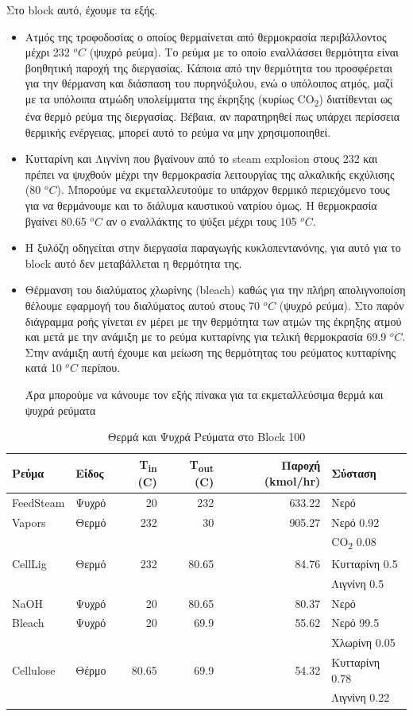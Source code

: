 \documentclass[11pt]{article}
\begin{document}
Στο block αυτό, έχουμε τα εξής.
\begin{itemize}
\item Aτμός της τροφοδοσίας ο οποίος θερμαίνεται από θερμοκρασία περιβάλλοντος μέχρι 232 \(^oC\) (ψυχρό ρεύμα). Το ρεύμα με το οποίο εναλλάσσει θερμότητα είναι βοηθητική παροχή της διεργασίας. Κάποια από την θερμότητα του προσφέρεται για την θέρμανση και διάσπαση του πυρηνόξυλου, ενώ ο υπόλοιπος ατμός, μαζί με τα υπόλοιπα ατμώδη υπολείμματα της έκρηξης (κυρίως CO\textsubscript{2}) διατίθενται ως ένα θερμό ρεύμα της διεργασίας. Βέβαια, αν παρατηρηθεί πως υπάρχει περίσσεια θερμικής ενέργειας, μπορεί αυτό το ρεύμα να μην χρησιμοποιηθεί.
\item Κυτταρίνη και Λιγνίνη που βγαίνουν από το steam explosion στους 232 και πρέπει να ψυχθούν μέχρι την θερμοκρασία λειτουργίας της αλκαλικής εκχύλισης (80 \(^oC\)). Μπορούμε να εκμεταλλευτούμε το υπάρχον θερμικό περιεχόμενο τους για να θερμάνουμε και το διάλυμα καυστικού νατρίου όμως. Η θερμοκρασία βγαίνει 80.65 \(^oC\) αν ο εναλλάκτης το ψύξει μέχρι τους 105 \(^oC\).
\item Η ξυλόζη οδηγείται στην διεργασία παραγωγής κυκλοπεντανόνης, για αυτό για το block αυτό δεν μεταβάλλεται η θερμότητα της.
\item Θέρμανση του διαλύματος χλωρίνης (bleach) καθώς για την πλήρη απολιγνοποίση θέλουμε εφαρμογή του διαλύματος αυτού στους 70 \(^oC\) (ψυχρό ρεύμα). Στο παρόν διάγραμμα ροής γίνεται εν μέρει με την θερμότητα των ατμών της έκρηξης ατμού και μετά με την ανάμιξη με το ρεύμα κυτταρίνης για τελική θερμοκρασία 69.9 \(^oC\). Στην ανάμιξη αυτή έχουμε και μείωση της θερμότητας του ρεύματος κυτταρίνης κατά 10 \(^oC\) περίπου.

Άρα μπορούμε να κάνουμε τον εξής πίνακα για τα εκμεταλλεύσιμα θερμά και ψυχρά ρεύματα
\end{itemize}

\begin{table}[htbp]
\caption{Θερμά και Ψυχρά Ρεύματα στο Block 100}
\centering
\begin{tabular}{llrrrl}
Ρεύμα & Είδος & Τ\textsubscript{in} (C) & Τ\textsubscript{out} (C) & Παροχή (kmol/hr) & Σύσταση\\
\hline
FeedSteam & Ψυχρό & 20 & 232 & 633.22 & Νερό\\
\hline
Vapors & Θερμό & 232 & 30 & 905.27 & Νερό 0.92\\
 &  &  &  &  & CO\textsubscript{2} 0.08\\
\hline
CellLig & Θερμό & 232 & 80.65 & 84.76 & Κυτταρίνη 0.5\\
 &  &  &  &  & Λιγνίνη 0.5\\
\hline
NaOH & Ψυχρό & 20 & 80.65 & 80.37 & Νερό\\
\hline
Bleach & Ψυχρό & 20 & 69.9 & 55.62 & Νερό 99.5\\
 &  &  &  &  & Χλωρίνη 0.05\\
\hline
Cellulose & Θέρμο & 80.65 & 69.9 & 54.32 & Κυτταρίνη 0.78\\
 &  &  &  &  & Λιγνίνη 0.22\\
\hline
\end{tabular}
\end{table}
\end{document}
